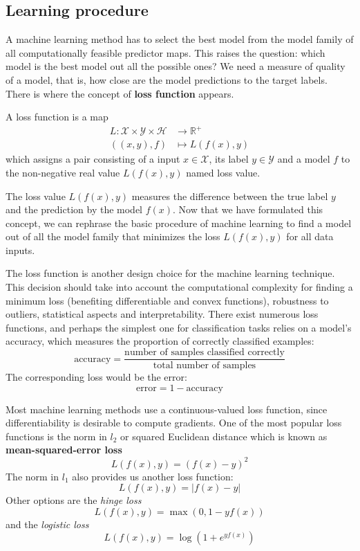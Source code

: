 \subsection{Learning procedure}

A machine learning method has to select the best model from the model family of all computationally feasible predictor maps. This raises the question: which model is the best model out all the possible ones? We need a measure of quality of a model, that is, how close are the model predictions to the target labels. There is where the concept of \textbf{loss function} appears. 

\begin{definicion}
    A loss function is a map
    \begin{align}
        L: \mathcal{X} \times \mathcal{Y} \times \mathcal{H} &\longrightarrow \mathbb{R}^{+} \\
        ((x,y),f) &\longmapsto L(f(x),y)
    \end{align}
    which assigns a pair consisting of a input $x \in \mathcal{X}$, its label $y\in \mathcal{Y}$ and a model $f$ to the non-negative real value $L(f(x),y)$ named loss value.
\end{definicion}

The loss value $L(f(x),y)$ measures the difference between the true label $y $ and the prediction by the model $f(x)$. Now that we have formulated this concept, we can rephrase the basic procedure of machine learning to find a model out of all the model family that minimizes the loss $L(f(x),y)$ for all data inputs.

The loss function is another design choice for the machine learning technique. This decision should take into account the computational complexity for finding a minimum loss (benefiting differentiable and convex functions), robustness to outliers, statistical aspects and interpretability. There exist numerous loss functions, and perhaps the simplest one for classification tasks relies on a model's accuracy, which measures the proportion of correctly classified examples:
\begin{equation}
    \text{accuracy} = \frac{\text{number of samples classified correctly}}{\text{total number of samples}}
\end{equation}
The corresponding loss would be the error:
$$\text{error} = 1-\text{accuracy}$$

Most machine learning methods use a continuous-valued loss function, since differentiability is desirable to compute gradients. One of the most popular loss functions is the norm in $l_2$ or squared Euclidean distance which is known as \textbf{mean-squared-error loss}
$$L(f(x),y)=(f(x)-y)^2$$
The norm in $l_1$ also provides us another loss function:
$$L(f(x),y)=|f(x)-y|$$
Other options are the \textit{hinge loss}
$$L(f(x),y) = \max (0, 1-yf(x))$$
and the \textit{logistic loss}
$$L(f(x),y) =\log (1+e^{yf(x)})$$

